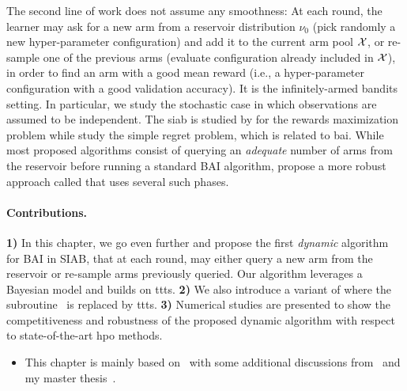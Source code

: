 The second line of work does not assume any smoothness: At each round, the learner may ask for a new arm from a \gls{reservoir} distribution $\nu_0$ (pick randomly a new hyper-parameter configuration) and add it to the current arm pool $\mathcal{X}$, or re-sample one of the previous arms (evaluate configuration already included in $\mathcal{X}$), in order to find an arm with a good mean reward (i.e., a hyper-parameter configuration with a good validation accuracy). It is the \gls{infinitely-armed bandits} setting. In particular, we study the stochastic case in which observations are assumed to be independent. The \gls{siab} is studied by \citet{berry1997infinite,wang2008ucbv} for the rewards maximization problem while \citet{carpentier2015siri,aziz2018confidence} study the simple regret problem, which is related to \gls{bai}. While most proposed algorithms consist of querying an \emph{adequate} number of arms from the reservoir before running a standard BAI algorithm, \cite{li2017hyperband} propose a more robust approach called \Hyperband{} that uses several such phases.

\paragraph{Contributions.}
\textbf{1)}
In this chapter, we go even further and propose the first \emph{dynamic} algorithm for BAI in SIAB, that at each round, may either query a new arm from the reservoir or re-sample arms previously queried. Our algorithm leverages a Bayesian model and builds on \gls{ttts}. 
\textbf{2)}
We also introduce a variant of \Hyperband{} where the \SHA subroutine~\citep{karnin2013sha} is replaced by \gls{ttts}. 
\textbf{3)}
Numerical studies are presented to show the competitiveness and robustness of the proposed dynamic algorithm with respect to state-of-the-art \gls{hpo} methods.


\medskip

\begin{itemize}[label=]
    \item This chapter is mainly based on~\cite{shang2019dttts} with some additional discussions from~\cite{shang2020dttts} and my master thesis~\citep{shang2017master}.
\end{itemize}

